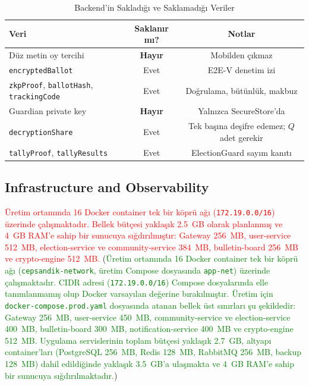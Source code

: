 \documentclass[a4paper,fleqn]{cas-sc}
\begin{document}
\begin{table}[ht]
\centering
\caption{Backend'in Sakladığı ve Saklamadığı Veriler}
\label{tab:data_privacy}
\begin{tabular}{lcc}
\toprule
\textbf{Veri} & \textbf{Saklanır mı?} & \textbf{Notlar} \\
\midrule
Düz metin oy tercihi  & \textbf{Hayır} & Mobilden çıkmaz \\
\texttt{encryptedBallot}   & Evet  & E2E-V denetim izi \\
\texttt{zkpProof}, \texttt{ballotHash}, \texttt{trackingCode} & Evet & Doğrulama, bütünlük, makbuz \\
Guardian private key  & \textbf{Hayır} & Yalnızca SecureStore'da \\
\texttt{decryptionShare}   & Evet  & Tek başına deşifre edemez; $Q$ adet gerekir \\
\texttt{tallyProof}, \texttt{tallyResults} & Evet & ElectionGuard sayım kanıtı \\
\bottomrule
\end{tabular}
\end{table}

\subsection{Infrastructure and Observability}
\label{subsec:infra}

\textcolor{red}{Üretim ortamında 16 Docker container tek bir köprü ağı
(\texttt{172.19.0.0/16}) üzerinde çalışmaktadır.
Bellek bütçesi yaklaşık 2.5~GB olarak planlanmış ve 4~GB RAM'e sahip
bir sunucuya sığdırılmıştır: Gateway 256~MB, user-service 512~MB,
election-service ve community-service 384~MB, bulletin-board 256~MB
ve crypto-engine 512~MB.}
(\textcolor{green}{Üretim ortamında 16 Docker container tek bir köprü ağı (\texttt{cepsandik-network}, üretim Compose dosyasında \texttt{app-net}) üzerinde çalışmaktadır. CIDR adresi (\texttt{172.19.0.0/16}) Compose dosyalarında elle tanımlanmamış olup Docker varsayılan değerine bırakılmıştır. Üretim için \texttt{docker-compose.prod.yaml} dosyasında atanan bellek üst sınırları şu şekildedir: Gateway 256~MB, user-service 450~MB, community-service ve election-service 400~MB, bulletin-board 300~MB, notification-service 400~MB ve crypto-engine 512~MB. Uygulama servislerinin toplam bütçesi yaklaşık 2.7~GB, altyapı container'ları (PostgreSQL 256~MB, Redis 128~MB, RabbitMQ 256~MB, backup 128~MB) dahil edildiğinde yaklaşık 3.5~GB'a ulaşmakta ve 4~GB RAM'e sahip bir sunucuya sığdırılmaktadır.})
\end{document}
